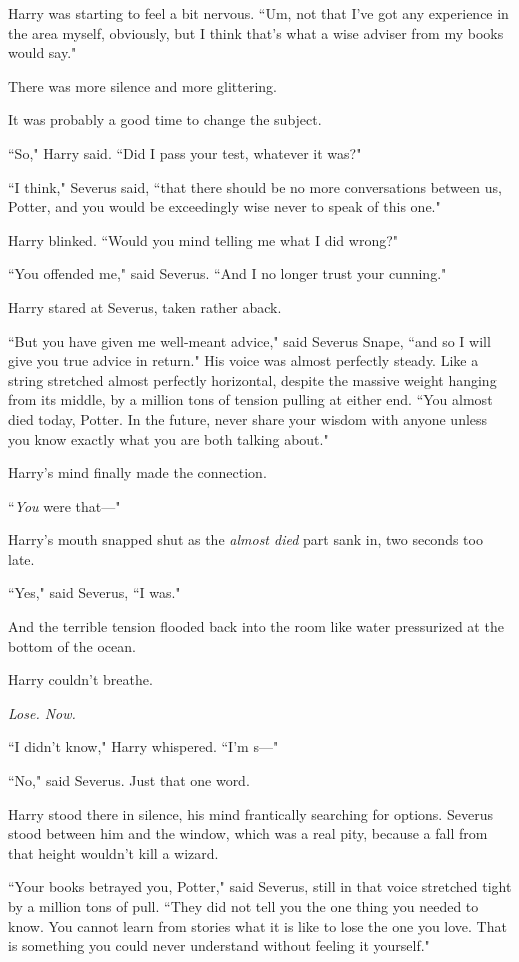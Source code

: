 Harry was starting to feel a bit nervous. ``Um, not that I've got any experience in the area myself, obviously, but I think that's what a wise adviser from my books would say."

There was more silence and more glittering.

It was probably a good time to change the subject.

``So," Harry said. ``Did I pass your test, whatever it was?"

``I think," Severus said, ``that there should be no more conversations between us, Potter, and you would be exceedingly wise never to speak of this one."

Harry blinked. ``Would you mind telling me what I did wrong?"

``You offended me," said Severus. ``And I no longer trust your cunning."

Harry stared at Severus, taken rather aback.

``But you have given me well-meant advice," said Severus Snape, ``and so I will give you true advice in return." His voice was almost perfectly steady. Like a string stretched almost perfectly horizontal, despite the massive weight hanging from its middle, by a million tons of tension pulling at either end. ``You almost died today, Potter. In the future, never share your wisdom with anyone unless you know exactly what you are both talking about."

Harry's mind finally made the connection.

``\emph{You} were that---"

Harry's mouth snapped shut as the \emph{almost died} part sank in, two seconds too late.

``Yes," said Severus, ``I was."

And the terrible tension flooded back into the room like water pressurized at the bottom of the ocean.

Harry couldn't breathe.

\emph{Lose. Now.}

``I didn't know," Harry whispered. ``I'm s---"

``No," said Severus. Just that one word.

Harry stood there in silence, his mind frantically searching for options. Severus stood between him and the window, which was a real pity, because a fall from that height wouldn't kill a wizard.

``Your books betrayed you, Potter," said Severus, still in that voice stretched tight by a million tons of pull. ``They did not tell you the one thing you needed to know. You cannot learn from stories what it is like to lose the one you love. That is something you could never understand without feeling it yourself."

